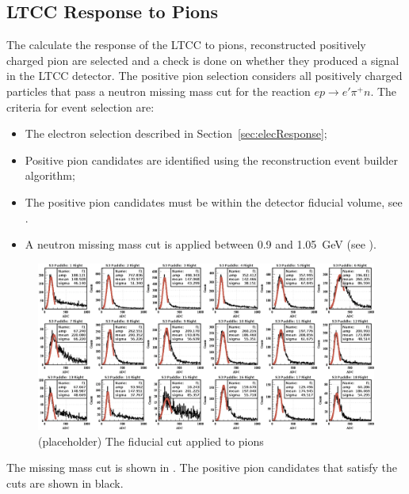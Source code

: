 \subsection{LTCC Response to Pions}

The calculate the response of the LTCC to pions, reconstructed positively charged pion are selected
and a check is done on whether they produced a signal in the LTCC detector. The positive pion selection
considers all positively charged particles that pass a neutron missing mass cut for the reaction
$ep \to e'\pi^+n$. The criteria for event selection are:

\begin{itemize}
    \item The electron selection described in Section~\ref{sec:elecResponse};
    \item Positive pion candidates are identified using the reconstruction event builder algorithm;
    \item The positive pion candidates must be within the detector fiducial volume, see .
    \item A neutron missing mass cut is applied between 0.9 and 1.05~GeV (see ).
\end{itemize}

\begin{figure}
	\centering
	\includegraphics[width=0.98\columnwidth,keepaspectratio]{img/neutronMM.png}
	\caption{(placeholder) The fiducial cut applied to pions}
	\label{fig:detFiducialCut}
\end{figure}

The missing mass cut is shown in . The positive pion candidates that satisfy the cuts are shown
in black.

